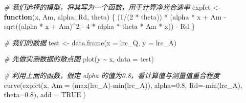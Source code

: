 \documentclass[
]{krantz}
\makeatletter
\newenvironment{Shaded}{\begin{snugshade}}{\end{snugshade}}
\newcommand{\AttributeTok}[1]{\textcolor[rgb]{0.77,0.63,0.00}{#1}}
\newcommand{\CommentTok}[1]{\textcolor[rgb]{0.56,0.35,0.01}{\textit{#1}}}
\newcommand{\ConstantTok}[1]{\textcolor[rgb]{0.00,0.00,0.00}{#1}}
\newcommand{\ControlFlowTok}[1]{\textcolor[rgb]{0.13,0.29,0.53}{\textbf{#1}}}
\newcommand{\DecValTok}[1]{\textcolor[rgb]{0.00,0.00,0.81}{#1}}
\newcommand{\FloatTok}[1]{\textcolor[rgb]{0.00,0.00,0.81}{#1}}
\newcommand{\FunctionTok}[1]{\textcolor[rgb]{0.00,0.00,0.00}{#1}}
\newcommand{\NormalTok}[1]{#1}
\newcommand{\OtherTok}[1]{\textcolor[rgb]{0.56,0.35,0.01}{#1}}
\newcommand{\SpecialCharTok}[1]{\textcolor[rgb]{0.00,0.00,0.00}{#1}}
\newenvironment{kframe}{%
\medskip{}
\setlength{\fboxsep}{.8em}
 \def\at@end@of@kframe{}%
 \ifinner\ifhmode%
  \def\at@end@of@kframe{\end{minipage}}%
  \begin{minipage}{\columnwidth}%
 \fi\fi%
 \def\FrameCommand##1{\hskip\@totalleftmargin \hskip-\fboxsep
 \colorbox{shadecolor}{##1}\hskip-\fboxsep
     \hskip-\linewidth \hskip-\@totalleftmargin \hskip\columnwidth}%
 \MakeFramed {\advance\hsize-\width
   \@totalleftmargin\z@ \linewidth\hsize
   \@setminipage}}%
 {\par\unskip\endMakeFramed%
 \at@end@of@kframe}
\renewenvironment{Shaded}{\begin{kframe}}{\end{kframe}}
\makeatother
\begin{document}
\begin{Shaded}
\begin{Highlighting}[]
\CommentTok{\# 我们选择的模型，将其写为一个函数，用于计算净光合速率}
\NormalTok{expfct }\OtherTok{\textless{}{-}} \ControlFlowTok{function}\NormalTok{(x, Am, alpha, Rd, theta) \{}
\NormalTok{  (}\DecValTok{1}\SpecialCharTok{/}\NormalTok{(}\DecValTok{2} \SpecialCharTok{*}\NormalTok{ theta)) }\SpecialCharTok{*}\NormalTok{ (alpha }\SpecialCharTok{*}\NormalTok{ x }\SpecialCharTok{+}\NormalTok{ Am }\SpecialCharTok{{-}} 
  \FunctionTok{sqrt}\NormalTok{((alpha }\SpecialCharTok{*}\NormalTok{ x }\SpecialCharTok{+}\NormalTok{ Am)}\SpecialCharTok{\^{}}\DecValTok{2} \SpecialCharTok{{-}} \DecValTok{4} \SpecialCharTok{*}\NormalTok{ alpha }\SpecialCharTok{*}\NormalTok{ theta }\SpecialCharTok{*}\NormalTok{ Am }\SpecialCharTok{*}\NormalTok{ x)) }\SpecialCharTok{{-}}\NormalTok{ Rd}
\NormalTok{\}}

\CommentTok{\# 我们的数据}
\NormalTok{test }\OtherTok{\textless{}{-}} \FunctionTok{data.frame}\NormalTok{(}\AttributeTok{x =}\NormalTok{ lrc\_Q, }\AttributeTok{y =}\NormalTok{ lrc\_A)}
\end{Highlighting}
\end{Shaded}

\begin{Shaded}
\begin{Highlighting}[]
\CommentTok{\# 先做实测数据的散点图}
\FunctionTok{plot}\NormalTok{(y }\SpecialCharTok{\textasciitilde{}}\NormalTok{ x, }\AttributeTok{data =}\NormalTok{ test)}

\CommentTok{\# 利用上面的函数，假定 alpha 的值为0.8，看计算值与测量值重合程度}
\FunctionTok{curve}\NormalTok{(}\FunctionTok{expfct}\NormalTok{(x, }\AttributeTok{Am =}\NormalTok{ (}\FunctionTok{max}\NormalTok{(lrc\_A)}\SpecialCharTok{{-}}\FunctionTok{min}\NormalTok{(lrc\_A)),}
     \AttributeTok{alpha=}\FloatTok{0.8}\NormalTok{, }\AttributeTok{Rd=}\SpecialCharTok{{-}}\FunctionTok{min}\NormalTok{(lrc\_A), }\AttributeTok{theta=}\FloatTok{0.8}\NormalTok{), }\AttributeTok{add =} \ConstantTok{TRUE}
\NormalTok{             )}
\end{Highlighting}
\end{Shaded}
\end{document}
